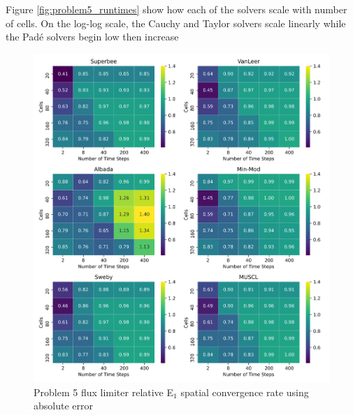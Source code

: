 Figure \ref{fig:problem5_runtimes} show how each of the solvers scale with number of cells. On the log-log scale, the Cauchy and Taylor solvers scale linearly while the Pad\'e solvers begin low then increase 

\clearpage

\begin{figure}[p]
    \centering
    \includegraphics[width=6in]{images/chapter-5/progressionProblems/problem5/problem5E1FluxLimiterConvergenceRate.png}
    \caption{Problem 5 flux limiter relative E${}_{1}$ spatial convergence rate using absolute error}
    \label{fig:problem5_l1error_fluxlimiter_convergence_rate}
\end{figure}

\clearpage

